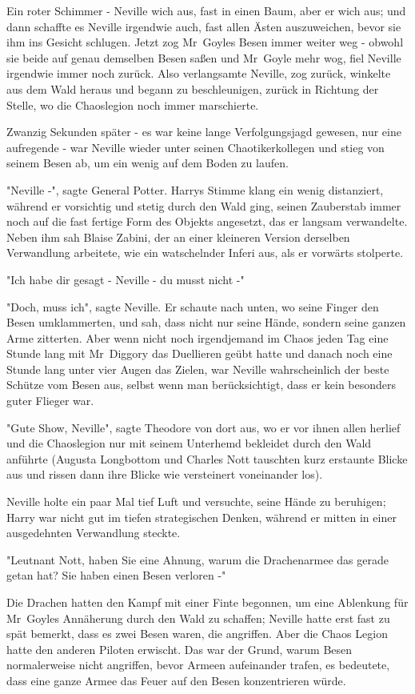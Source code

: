 {Ein roter Schimmer - Neville wich aus, fast in einen Baum, aber er wich aus; und dann schaffte es Neville irgendwie auch, fast allen Ästen auszuweichen, bevor sie ihm ins Gesicht schlugen. Jetzt zog Mr~Goyles Besen immer weiter weg - obwohl sie beide auf genau demselben Besen saßen und Mr~Goyle mehr wog, fiel Neville irgendwie immer noch zurück. Also verlangsamte Neville, zog zurück, winkelte aus dem Wald heraus und begann zu beschleunigen, zurück in Richtung der Stelle, wo die Chaoslegion noch immer marschierte.

Zwanzig Sekunden später - es war keine lange Verfolgungsjagd gewesen, nur eine aufregende - war Neville wieder unter seinen Chaotikerkollegen und stieg von seinem Besen ab, um ein wenig auf dem Boden zu laufen.

"Neville -", sagte General Potter. Harrys Stimme klang ein wenig distanziert, während er vorsichtig und stetig durch den Wald ging, seinen Zauberstab immer noch auf die fast fertige Form des Objekts angesetzt, das er langsam verwandelte. Neben ihm sah Blaise Zabini, der an einer kleineren Version derselben Verwandlung arbeitete, wie ein watschelnder Inferi aus, als er vorwärts stolperte.

"Ich habe dir gesagt - Neville - du musst nicht -"

"Doch, muss ich", sagte Neville. Er schaute nach unten, wo seine Finger den Besen umklammerten, und sah, dass nicht nur seine Hände, sondern seine ganzen Arme zitterten. Aber wenn nicht noch irgendjemand im Chaos jeden Tag eine Stunde lang mit Mr~Diggory das Duellieren geübt hatte und danach noch eine Stunde lang unter vier Augen das Zielen, war Neville wahrscheinlich der beste Schütze vom Besen aus, selbst wenn man berücksichtigt, dass er kein besonders guter Flieger war.

"Gute Show, Neville", sagte Theodore von dort aus, wo er vor ihnen allen herlief und die Chaoslegion nur mit seinem Unterhemd bekleidet durch den Wald anführte (Augusta Longbottom und Charles Nott tauschten kurz erstaunte Blicke aus und rissen dann ihre Blicke wie versteinert voneinander los).

Neville holte ein paar Mal tief Luft und versuchte, seine Hände zu beruhigen; Harry war nicht gut im tiefen strategischen Denken, während er mitten in einer ausgedehnten Verwandlung steckte.

"Leutnant Nott, haben Sie eine Ahnung, warum die Drachenarmee das gerade getan hat? Sie haben einen Besen verloren -"

Die Drachen hatten den Kampf mit einer Finte begonnen, um eine Ablenkung für Mr~Goyles Annäherung durch den Wald zu schaffen; Neville hatte erst fast zu spät bemerkt, dass es zwei Besen waren, die angriffen. Aber die Chaos Legion hatte den anderen Piloten erwischt. Das war der Grund, warum Besen normalerweise nicht angriffen, bevor Armeen aufeinander trafen, es bedeutete, dass eine ganze Armee das Feuer auf den Besen konzentrieren würde.

}

